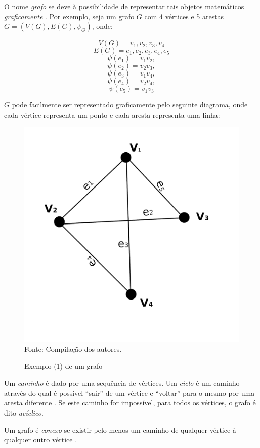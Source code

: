 \documentclass[twocolumn, 10pt]{extarticle}
\begin{document}
O nome \textit{grafo} se deve à possibilidade de representar tais objetos matemáticos \textit{graficamente} \cite[p. 2]{bondy}. Por exemplo, seja um grafo $G$ com 4 vértices e 5 arestas $G = (V(G), E(G), \psi_G)$, onde:

\[
V(G) = {v_1, v_2, v_3, v_4}
\]
\[
E(G) = {e_1, e_2, e_3, e_4, e_5}
\]
\[
\psi(e_1) = v_1v_2,\]
\[
\psi(e_2) = v_2v_3, 
\]
\[
\psi(e_3) = v_1v_4,
\]
\[
\psi(e_4) = v_2v_4, 
\]
\[
\psi(e_5) = v_1v_3
\]

$G$ pode facilmente ser representado graficamente pelo seguinte diagrama, onde cada vértice representa um ponto e cada aresta representa uma linha:

\begin{figure}[H]
	\caption{Exemplo (1) de um grafo} 
	\centering
	\includegraphics[scale=0.7]{grafo1}
	\\ Fonte: Compilação dos autores.
\end{figure}

Um \textit{caminho} é dado por uma sequência de vértices. Um \textit{ciclo} é um caminho através do qual é possível ``sair'' de um vértice e ``voltar'' para o mesmo por uma aresta diferente \cite[p. 519]{sedgewick}. Se este caminho for impossível, para todos os vértices, o grafo é dito \textit{acíclico}.

Um grafo é \textit{conexo} se existir pelo menos um caminho de qualquer vértice à qualquer outro vértice \cite[p. 519]{sedgewick}.
\end{document}
